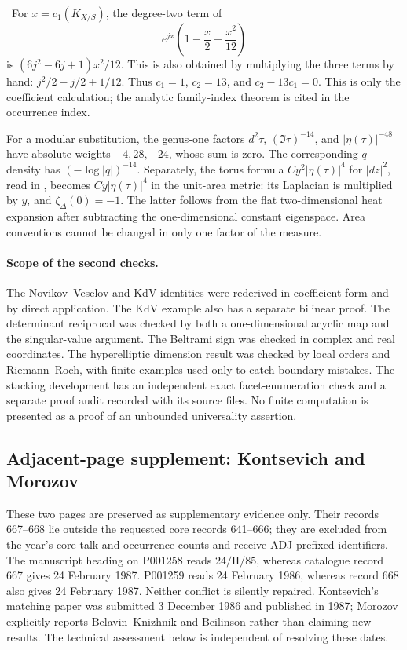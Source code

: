 \begin{example}\oursComputed\
For \(x=c_1(K_{X/S})\), the degree-two term of
\[
 e^{jx}\left(1-\frac{x}{2}+\frac{x^2}{12}\right)
\]
is \((6j^2-6j+1)x^2/12\). This is also obtained by multiplying the three
terms by hand: \(j^2/2-j/2+1/12\). Thus \(c_1=1\), \(c_2=13\), and
\(c_2-13c_1=0\). This is only the coefficient calculation; the analytic
family-index theorem is cited in the occurrence index.

For a modular substitution, the genus-one factors
\(d^2\tau\), \((\Im\tau)^{-14}\), and \(|\eta(\tau)|^{-48}\) have
absolute weights \(-4,28,-24\), whose sum is zero. The corresponding
\(q\)-density has \((-\log|q|)^{-14}\). Separately, the torus formula
\(C y^2|\eta(\tau)|^4\) for \(|dz|^2\), read in
\citet[\S5.0.1, equation (5.1)]{kokotov2007polyhedral}, becomes
\(C y|\eta(\tau)|^4\) in the unit-area metric: its Laplacian is multiplied
by \(y\), and \(\zeta_\Delta(0)=-1\). The latter follows from the flat
two-dimensional heat expansion after subtracting the one-dimensional
constant eigenspace. Area conventions cannot be changed in only one factor
of the measure.
\end{example}

\paragraph{Scope of the second checks.}
The Novikov--Veselov and KdV identities were rederived in coefficient form and
by direct application. The KdV example also has a separate bilinear proof.
The determinant reciprocal was checked by both a one-dimensional acyclic map
and the singular-value argument. The Beltrami sign was checked in complex and
real coordinates. The hyperelliptic dimension result was checked by local
orders and Riemann--Roch, with finite examples used only to catch boundary
mistakes. The stacking development has an independent exact facet-enumeration
check and a separate proof audit recorded with its source files. No finite
computation is presented as a proof of an unbounded universality assertion.

\subsection{Adjacent-page supplement: Kontsevich and Morozov}
\label{supp:1985-adjacent}
These two pages are preserved as supplementary evidence only. Their records
667--668 lie outside the requested core records 641--666; they are excluded
from the year's core talk and occurrence counts and receive ADJ-prefixed
identifiers. The manuscript heading on P001258 reads \(24/\mathrm{II}/85\),
whereas catalogue record 667 gives 24 February 1987. P001259 reads
24 February 1986, whereas record 668 also gives 24 February 1987.
Neither conflict is silently repaired. Kontsevich's matching paper was
submitted 3 December 1986 and published in 1987; Morozov explicitly reports
Belavin--Knizhnik and Beilinson rather than claiming new results. The technical
assessment below is independent of resolving these dates.

